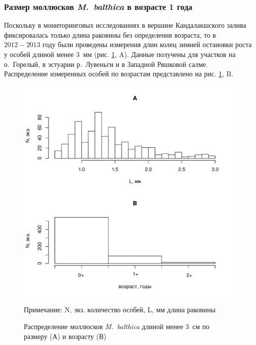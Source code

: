 
	\subsubsection{Размер моллюсков {\it M.~balthica} в возрасте 1 года}

Поскольку в мониторинговых исследованиях в вершине Кандалакшского залива фиксировалась только длина раковины без определения возраста, то в $2012 - 2013$ году были проведены  измерения длин колец зимней остановки роста у особей длиной менее $3$~мм (рис. \ref{ris:vozrast_menee_3mm}, A). 
Данные получены для участков на о.~Горелый, в эстуарии р.~Лувеньги и в Западной Ряшковой салме. 
Распределение измеренных особей по возрастам представлено на рис. \ref{ris:vozrast_menee_3mm}, B.
	\begin{figure}[p]
		\includegraphics{../White_Sea/growth_young/hist_obili_po_godam1.pdf}
	\caption{Распределение моллюсков {\it M.~balthica} длиной менее $3$~см по размеру (А) и возрасту (В)}
	\label{ris:vozrast_menee_3mm}
	{\footnotesize Примечание: N, экз. \textemdash количество особей, L, мм \textemdash длина раковины}
	\end{figure}

